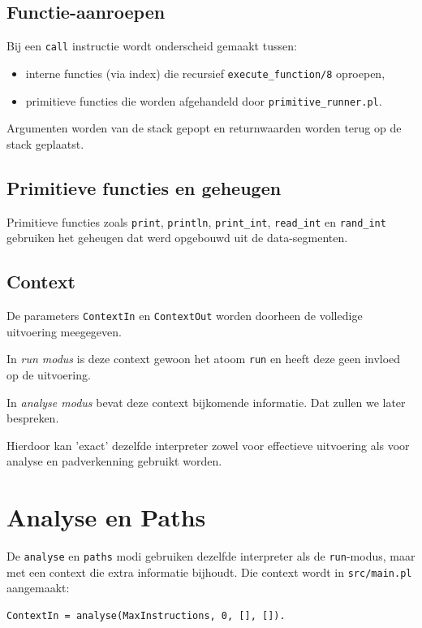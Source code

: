 \documentclass[a4paper,11pt]{article}
\begin{document}
\subsection*{Functie-aanroepen}

Bij een \texttt{call} instructie wordt onderscheid gemaakt tussen:

\begin{itemize}
    \item interne functies (via index) die recursief \texttt{execute\_function/8} oproepen,
    \item primitieve functies die worden afgehandeld door \texttt{primitive\_runner.pl}.
\end{itemize}

Argumenten worden van de stack gepopt en returnwaarden worden terug op de stack geplaatst.

\subsection*{Primitieve functies en geheugen}

Primitieve functies zoals \texttt{print}, \texttt{println}, \texttt{print\_int}, \texttt{read\_int} en \texttt{rand\_int}
gebruiken het geheugen dat werd opgebouwd uit de data-segmenten.

\subsection*{Context}

De parameters \texttt{ContextIn} en \texttt{ContextOut} worden doorheen de volledige uitvoering meegegeven.

In \emph{run modus} is deze context gewoon het atoom \texttt{run} en heeft deze geen invloed op de uitvoering.

In \emph{analyse modus} bevat deze context bijkomende informatie. Dat zullen we later bespreken.


Hierdoor kan 'exact' dezelfde interpreter zowel voor effectieve uitvoering als voor analyse en padverkenning gebruikt worden.

\section{Analyse en Paths}

De \texttt{analyse} en \texttt{paths} modi gebruiken dezelfde interpreter als de \texttt{run}-modus, maar met een context die extra informatie bijhoudt.
Die context wordt in \texttt{src/main.pl} aangemaakt:
\begin{lstlisting}
ContextIn = analyse(MaxInstructions, 0, [], []).
\end{lstlisting}
\end{document}
